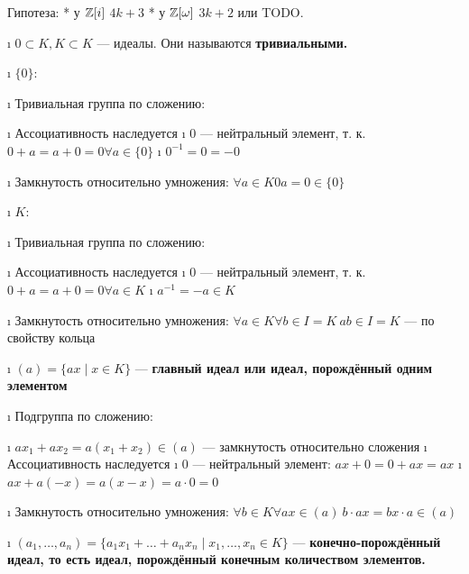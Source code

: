 \begin{solution}
Гипотеза:
* у \(\mathbb{Z}[i]\) \(4k+3\)
* у \(\mathbb{Z}[\omega]\) \(3k+2\) или TODO.
\end{solution}

\begin{problem}[14 (3.9)]
\end{problem}

\begin{solution}

\begin{enumerate}
\def\labelenumi{\alph{enumi})}
\tightlist
\i
  \(0 \subset K, K \subset K\) --- идеалы. Они называются \bf{тривиальными}.

  \begin{itemize}
  \tightlist
  \i
    \(\{0\}\):

    \begin{enumerate}
    \def\labelenumii{\arabic{enumii}.}
    \tightlist
    \i
      Тривиальная группа по сложению:

      \begin{itemize}
      \tightlist
      \i
        Ассоциативность наследуется
      \i
        \(0\) --- нейтральный элемент, т. к. \(0+a=a+0=0 \forall a \in \{0\}\)
      \i
        \(0^{-1} = 0 = -0\)
      \end{itemize}
    \i
      Замкнутость относительно умножения:
      \(\forall a \in K 0a=0 \in \{0\}\)
    \end{enumerate}
  \i
    \(K\):

    \begin{enumerate}
    \def\labelenumii{\arabic{enumii}.}
    \tightlist
    \i
      Тривиальная группа по сложению:

      \begin{itemize}
      \tightlist
      \i
        Ассоциативность наследуется
      \i
        \(0\) --- нейтральный элемент, т. к. \(0+a=a+0=0 \forall a \in K\)
      \i
        \(a^{-1} = -a \in K\)
      \end{itemize}
    \i
      Замкнутость относительно умножения:
      \(\forall a \in K \forall b \in I=K \ ab \in I=K\) --- по свойству кольца
    \end{enumerate}
  \end{itemize}
\i
  \((a) = \{ax \mid x\in K\}\) --- \bf{главный идеал} или \bf{идеал, порождённый одним элементом}

  \begin{enumerate}
  \def\labelenumii{\arabic{enumii}.}
  \tightlist
  \i
    Подгруппа по сложению:

    \begin{itemize}
    \tightlist
    \i
      \(ax_1+ax_2=a(x_1+x_2)\in(a)\) --- замкнутость относительно сложения
    \i
      Ассоциативность наследуется
    \i
      \(0\) --- нейтральный элемент: \(ax+0=0+ax=ax\)
    \i
      \(ax+a(-x)=a(x-x)=a\cdot 0=0\)
    \end{itemize}
  \i
    Замкнутость относительно умножения:
    \(\forall b \in K \forall ax \in (a) \ b\cdot ax = bx \cdot a \in (a)\)
  \end{enumerate}
\i
  \((a_1,\ldots,a_n) = \{a_1x_1+\ldots+a_nx_n \mid x_1,\ldots,x_n \in K\}\) --- \bf{конечно-порождённый идеал}, то есть идеал, порождённый конечным количеством элементов.


\end{enumerate}
\end{solution}

